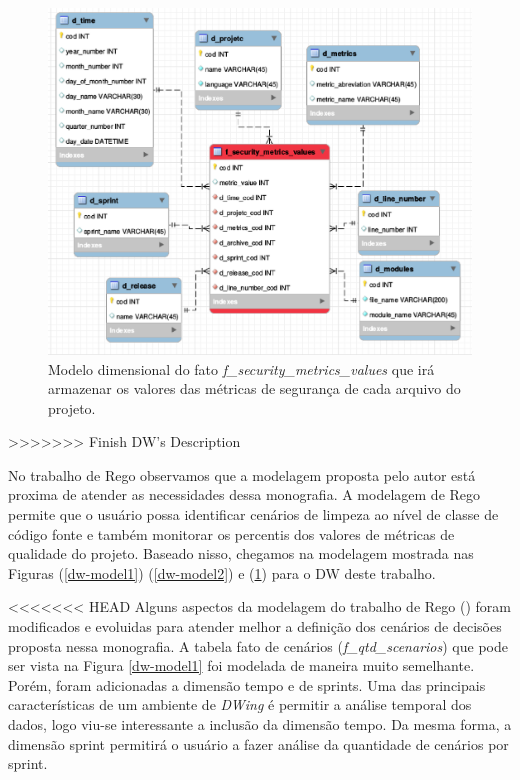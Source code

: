  \begin{figure}[H]
 	\centering
 		\includegraphics[scale=0.5]{figuras/dw-fato-security-metrics}
 		\caption{Modelo dimensional do fato \emph{f\_security\_metrics\_values} que irá armazenar os valores das métricas de segurança de cada arquivo do projeto.}
 		\label{dw-model3}
 \end{figure}

 
>>>>>>> Finish DW's Description

No trabalho de Rego \citeyear{rego2014} observamos que a modelagem proposta pelo autor está proxima de atender as necessidades dessa monografia. A modelagem de Rego \citeyear{rego2014} permite que o usuário possa identificar cenários de limpeza ao nível de classe de código fonte e também monitorar os percentis dos valores de métricas de qualidade do projeto. Baseado nisso, chegamos na modelagem mostrada nas Figuras (\ref{dw-model1}) (\ref{dw-model2}) e (\ref{dw-model3}) para o DW deste trabalho.

<<<<<<< HEAD
Alguns aspectos da modelagem do trabalho de Rego (\citeyear{rego2014}) foram modificados e evoluidas para atender melhor a definição dos cenários de decisões proposta nessa monografia. A tabela fato de cenários (\emph{f\_qtd\_scenarios}) que pode ser vista na Figura \ref{dw-model1}  foi modelada de maneira muito semelhante. Porém, foram adicionadas a dimensão tempo e de sprints. Uma das principais características de um ambiente de \emph{DWing} é permitir a análise temporal dos dados, logo viu-se interessante a inclusão da dimensão tempo. Da mesma forma, a dimensão sprint permitirá o usuário a fazer análise da quantidade de cenários por sprint. 

